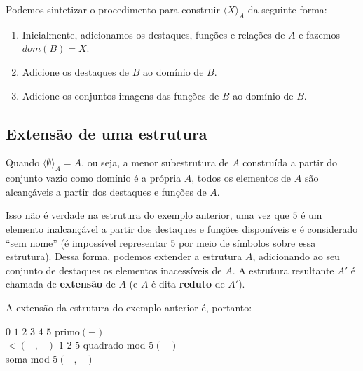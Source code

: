 Podemos sintetizar o procedimento para construir $\langle X \rangle_A$ da seguinte forma:
\begin{enumerate}
    \item Inicialmente, adicionamos os destaques, funções e relações de $A$ e fazemos $dom(B) = X$.
    \item Adicione os destaques de $B$ ao domínio de $B$.
    \item Adicione os conjuntos imagens das funções de $B$ ao domínio de $B$.  
\end{enumerate}

\subsection{Extensão de uma estrutura}

Quando $\langle \emptyset \rangle_A = A$, ou seja, a menor subestrutura de $A$ construída a partir do conjunto vazio como domínio é a própria $A$, todos os elementos de $A$ são alcançáveis a partir dos destaques e funções de $A$.

Isso não é verdade na estrutura do exemplo anterior, uma vez que $5$ é um elemento inalcançável a partir dos destaques e funções disponíveis e é considerado ``sem nome'' (é impossível representar 5 por meio de símbolos sobre essa estrutura). Dessa forma, podemos extender a estrutura $A$, adicionando ao seu conjunto de destaques os elementos inacessíveis de $A$. A estrutura resultante $A'$ é chamada de \textbf{extensão} de $A$ (e $A$ é dita \textbf{reduto} de $A'$).
    
A extensão da estrutura do exemplo anterior é, portanto:
\begin{center}
    \begin{structure}
        {}
        {$0$ $1$ $2$ $3$ $4$ $5$}
        {primo$(-)$\\$<$$(-,-)$}
        {$1$ $2$ $5$}
        {quadrado-mod-5$(-)$\\soma-mod-5$(-,-)$}
    \end{structure} 
\end{center}